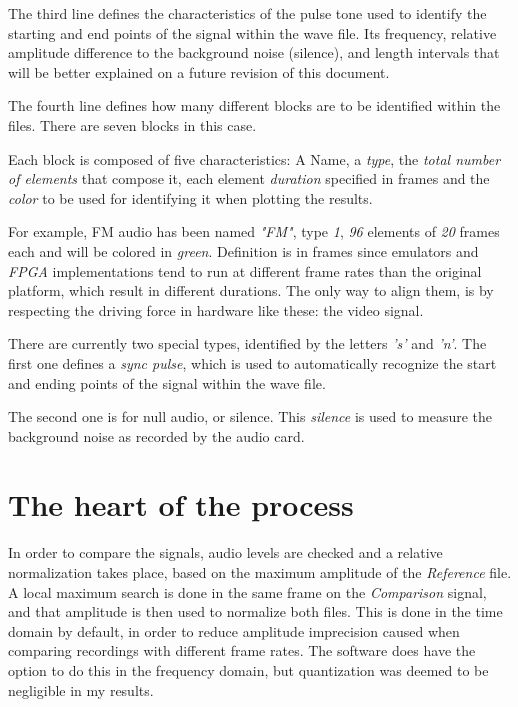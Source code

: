 \documentclass[10pt,a4paper]{report}
\begin{document}
The third line defines the characteristics of the pulse tone used to identify the starting and end points of the signal within the wave file. Its frequency, relative amplitude difference to the background noise (silence), and length intervals that will be better explained on a future revision of this document.

The fourth line defines how many different blocks are to be identified within the files. There are seven blocks in this case.

Each block is composed of five characteristics: A Name, a \textit{type}, the \textit{total number of elements} that compose it, each element \textit{duration} specified in frames and the \textit{color} to be used for identifying it when plotting the results.

For example, FM audio has been named \textit{"FM"}, type \textit{1}, \textit{96} elements of \textit{20} frames each and will be colored in \textit{green}. Definition is in frames since emulators and \textit{FPGA} implementations tend to run at different frame rates than the original platform, which result in different durations. The only way to align them, is by respecting the driving force in hardware like these: the video signal.

There are currently two special types, identified by the letters \textit{'s'} and \textit{'n'}. The first one defines a \textit{sync pulse}, which is used to automatically recognize the start and ending points of the signal within the wave file. 

The second one is for null audio, or silence. This \textit{silence} is used to measure the background noise as recorded by the audio card. 

\section{The heart of the process}

In order to compare the signals, audio levels are checked and a relative normalization takes place, based on the maximum amplitude of the \textit{Reference} file. A local maximum search is done in the same frame on the \textit{Comparison} signal, and that amplitude is then used to normalize both files. This is done in the time domain by default, in order to reduce amplitude imprecision caused when comparing recordings with different frame rates. The software does have the option to do this in the frequency domain, but quantization was deemed to be negligible in my results.
\end{document}
